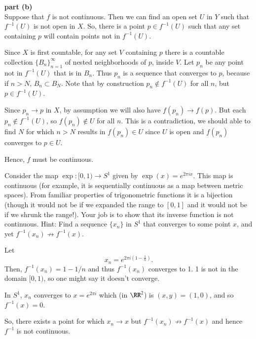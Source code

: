 \documentclass{homework}
\newcommand{\ra}{\rightarrow}
\begin{document}
\textbf{part (b)}\\
Suppose that $f$ is not continuous.  Then we can find an open set $U$ in $Y$
such that $f^{-1}(U)$ is not open in $X$.  So, there is a point
$p\in f^{-1}(U)$ such that any set containing $p$ will contain points
not in $f^{-1}(U)$.

Since $X$ is first countable, for any set $V$ containing $p$ there is a countable
collection $\{B_n\}_{n=1}^{\infty}$ of nested neighborhoods of $p$, inside $V$.
Let $p_n$ be any point not in $f^{-1}(U)$ that is in $B_n$.  Thus $p_n$ is
a sequence that converges to $p$, because if $n>N$, $B_n\subset B_N$.
Note that by construction $p_n\not\in f^{-1}(U)$ for all $n$, but $p\in f^{-1}(U)$.

Since $p_n\ra p$ in $X$, by assumption we will also have $f(p_n)\ra f(p)$.
But each $p_n\not\in f^{-1}(U)$, so $f(p_n)\not\in U$ for all $n$.  This
is a contradiction, we should able to find $N$ for which $n>N$ results
in $f(p_n)\in U$ since $U$ is open and $f(p_n)$ converges to $p\in U$.

Hence, $f$ must be continuous.

\hrulefill
\begin{exercise}{8}
Consider the map $\exp : [0,1)\rightarrow S^1$ given by $\exp(x)=e^{2\pi ix}$.
This map is continuous (for example, it is sequentially continuous as a
map between metric spaces).  From familiar properties of trigonometric
functions it is a bijection (though it would not be if we expanded the
range to $[0,1]$ and it would not be if we shrunk the range!).  Your job
is to show that its inverse function is not continuous.  Hint: Find a
sequence $\{x_n\}$ in $S^1$ that converges to some point $x$, and yet
$f^{-1}(x_n)\not\ra f^{-1}(x)$.
\end{exercise}
\solution
Let
$$ x_n = e^{2\pi i\left(1-\frac{1}{n}\right)}. $$
Then, $f^{-1}(x_n) = 1-1/n$ and thus $f^{-1}(x_n)$ converges to 1.  1 is not
in the domain $[0,1)$, so one might say it doesn't converge.

In $S^1$, $x_n$ converges to
$x=e^{2\pi i}$ which (in $\RR^2$) is $(x,y)=(1,0)$, and so $f^{-1}(x) = 0$.

So, there exists a point for which $x_n\ra x$ but $f^{-1}(x_n)\not\ra f^{-1}(x)$
and hence $f^{-1}$ is not continuous.
\end{document}
